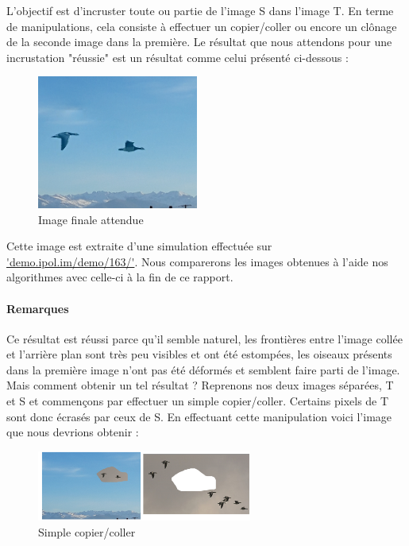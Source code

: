 L'objectif est d'incruster toute ou partie de l'image S dans l'image T. En terme de manipulations, cela consiste à effectuer un copier/coller ou encore un clônage de la seconde image dans la première.
Le résultat que nous attendons pour une incrustation "réussie" est un résultat comme celui présenté ci-dessous : 
    
\begin{center}
\begin{figure}[!htb]
   \centering
     \includegraphics[width = 150pt]{Images/clonage_done.png}
     \caption{Image  finale attendue}
\end{figure}
\end{center}
Cette image est extraite d'une simulation effectuée sur \url{'demo.ipol.im/demo/163/'}. Nous comparerons les images obtenues à l'aide nos algorithmes avec celle-ci à la fin de ce rapport.\newline
\paragraph{Remarques}
Ce résultat est réussi parce qu'il semble naturel, les frontières entre l'image collée et l'arrière plan sont très peu visibles et ont été estompées, les oiseaux présents dans la première image n'ont pas été déformés et semblent faire parti de l'image. 
Mais comment obtenir un tel résultat ?
\newline
Reprenons nos deux images séparées, T et S et commençons par effectuer un simple copier/coller. Certains pixels de T sont donc écrasés par ceux de S. En effectuant cette manipulation voici l'image que nous devrions obtenir : 
\begin{center}
\begin{figure}[H]
     \centering
     \includegraphics[width = 200pt]{Images/collage1.jpg}
     \caption{Simple copier/coller}
\end{figure}
\end{center}

